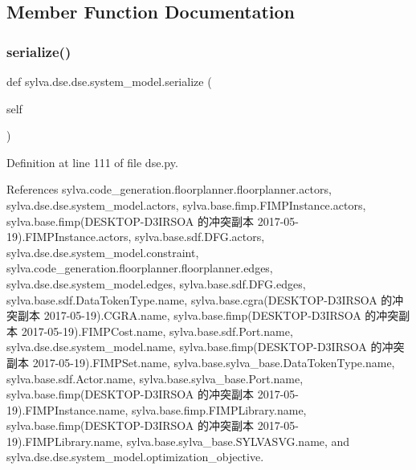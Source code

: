 \subsection{Member Function Documentation}
\mbox{\label{classsylva_1_1dse_1_1dse_1_1system__model_abdbd324e6d87f3baef25aeab12444edc}} 
\subsubsection{\texorpdfstring{serialize()}{serialize()}}
{\footnotesize\ttfamily def sylva.\+dse.\+dse.\+system\+\_\+model.\+serialize (\begin{DoxyParamCaption}\item[{}]{self }\end{DoxyParamCaption})}



Definition at line 111 of file dse.\+py.



References sylva.\+code\+\_\+generation.\+floorplanner.\+floorplanner.\+actors, sylva.\+dse.\+dse.\+system\+\_\+model.\+actors, sylva.\+base.\+fimp.\+F\+I\+M\+P\+Instance.\+actors, sylva.\+base.\+fimp(\+D\+E\+S\+K\+T\+O\+P-\/\+D3\+I\+R\+S\+O\+A 的冲突副本 2017-\/05-\/19).\+F\+I\+M\+P\+Instance.\+actors, sylva.\+base.\+sdf.\+D\+F\+G.\+actors, sylva.\+dse.\+dse.\+system\+\_\+model.\+constraint, sylva.\+code\+\_\+generation.\+floorplanner.\+floorplanner.\+edges, sylva.\+dse.\+dse.\+system\+\_\+model.\+edges, sylva.\+base.\+sdf.\+D\+F\+G.\+edges, sylva.\+base.\+sdf.\+Data\+Token\+Type.\+name, sylva.\+base.\+cgra(\+D\+E\+S\+K\+T\+O\+P-\/\+D3\+I\+R\+S\+O\+A 的冲突副本 2017-\/05-\/19).\+C\+G\+R\+A.\+name, sylva.\+base.\+fimp(\+D\+E\+S\+K\+T\+O\+P-\/\+D3\+I\+R\+S\+O\+A 的冲突副本 2017-\/05-\/19).\+F\+I\+M\+P\+Cost.\+name, sylva.\+base.\+sdf.\+Port.\+name, sylva.\+dse.\+dse.\+system\+\_\+model.\+name, sylva.\+base.\+fimp(\+D\+E\+S\+K\+T\+O\+P-\/\+D3\+I\+R\+S\+O\+A 的冲突副本 2017-\/05-\/19).\+F\+I\+M\+P\+Set.\+name, sylva.\+base.\+sylva\+\_\+base.\+Data\+Token\+Type.\+name, sylva.\+base.\+sdf.\+Actor.\+name, sylva.\+base.\+sylva\+\_\+base.\+Port.\+name, sylva.\+base.\+fimp(\+D\+E\+S\+K\+T\+O\+P-\/\+D3\+I\+R\+S\+O\+A 的冲突副本 2017-\/05-\/19).\+F\+I\+M\+P\+Instance.\+name, sylva.\+base.\+fimp.\+F\+I\+M\+P\+Library.\+name, sylva.\+base.\+fimp(\+D\+E\+S\+K\+T\+O\+P-\/\+D3\+I\+R\+S\+O\+A 的冲突副本 2017-\/05-\/19).\+F\+I\+M\+P\+Library.\+name, sylva.\+base.\+sylva\+\_\+base.\+S\+Y\+L\+V\+A\+S\+V\+G.\+name, and sylva.\+dse.\+dse.\+system\+\_\+model.\+optimization\+\_\+objective.


